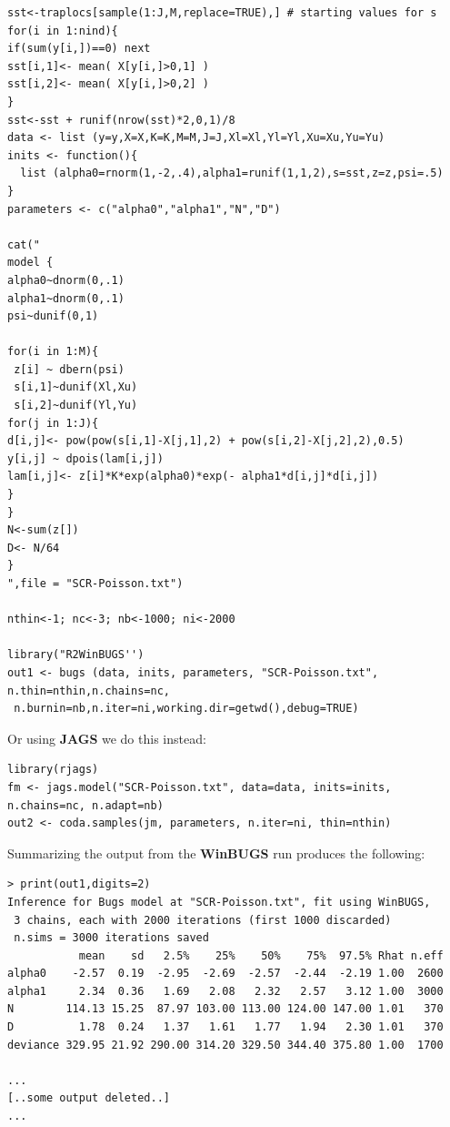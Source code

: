 {\small
\begin{verbatim}
sst<-traplocs[sample(1:J,M,replace=TRUE),] # starting values for s
for(i in 1:nind){
if(sum(y[i,])==0) next
sst[i,1]<- mean( X[y[i,]>0,1] )
sst[i,2]<- mean( X[y[i,]>0,2] )
}
sst<-sst + runif(nrow(sst)*2,0,1)/8
data <- list (y=y,X=X,K=K,M=M,J=J,Xl=Xl,Yl=Yl,Xu=Xu,Yu=Yu)
inits <- function(){
  list (alpha0=rnorm(1,-2,.4),alpha1=runif(1,1,2),s=sst,z=z,psi=.5)
}
parameters <- c("alpha0","alpha1","N","D")

cat("
model {
alpha0~dnorm(0,.1)
alpha1~dnorm(0,.1)
psi~dunif(0,1)

for(i in 1:M){
 z[i] ~ dbern(psi)
 s[i,1]~dunif(Xl,Xu)
 s[i,2]~dunif(Yl,Yu)
for(j in 1:J){
d[i,j]<- pow(pow(s[i,1]-X[j,1],2) + pow(s[i,2]-X[j,2],2),0.5)
y[i,j] ~ dpois(lam[i,j])
lam[i,j]<- z[i]*K*exp(alpha0)*exp(- alpha1*d[i,j]*d[i,j])
}
}
N<-sum(z[])
D<- N/64
}
",file = "SCR-Poisson.txt")

nthin<-1; nc<-3; nb<-1000; ni<-2000

library("R2WinBUGS'')
out1 <- bugs (data, inits, parameters, "SCR-Poisson.txt", n.thin=nthin,n.chains=nc,
 n.burnin=nb,n.iter=ni,working.dir=getwd(),debug=TRUE)
\end{verbatim}
}
{\flushleft Or using {\bf JAGS}  we do this instead: }
{\small
\begin{verbatim}
library(rjags)
fm <- jags.model("SCR-Poisson.txt", data=data, inits=inits, n.chains=nc, n.adapt=nb)
out2 <- coda.samples(jm, parameters, n.iter=ni, thin=nthin)
\end{verbatim}
}
{\flushleft 
Summarizing } the output from the {\bf WinBUGS}  run produces the following:
{\small
\begin{verbatim}
> print(out1,digits=2)
Inference for Bugs model at "SCR-Poisson.txt", fit using WinBUGS,
 3 chains, each with 2000 iterations (first 1000 discarded)
 n.sims = 3000 iterations saved
           mean    sd   2.5%    25%    50%    75%  97.5% Rhat n.eff
alpha0    -2.57  0.19  -2.95  -2.69  -2.57  -2.44  -2.19 1.00  2600
alpha1     2.34  0.36   1.69   2.08   2.32   2.57   3.12 1.00  3000
N        114.13 15.25  87.97 103.00 113.00 124.00 147.00 1.01   370
D          1.78  0.24   1.37   1.61   1.77   1.94   2.30 1.01   370
deviance 329.95 21.92 290.00 314.20 329.50 344.40 375.80 1.00  1700

...
[..some output deleted..]
...
\end{verbatim}
}





